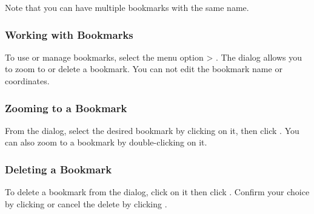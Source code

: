 Note that you can have multiple bookmarks with the same name.

\subsubsection{Working with Bookmarks}
To use or manage bookmarks, select the menu 
option  > .
The  dialog allows you to zoom to or delete a bookmark.
You can not edit the bookmark name or coordinates.

\subsubsection{Zooming to a Bookmark}
From the  dialog, select the desired bookmark by clicking on it, 
then click .
You can also zoom to a bookmark by double-clicking on it.

\subsubsection{Deleting a Bookmark}
To delete a bookmark from the  dialog, click on it then click
 .
Confirm your choice by clicking  or cancel the delete by clicking .
